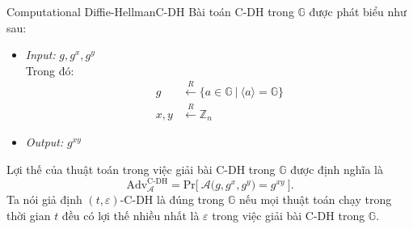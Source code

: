 \documentclass[class=report, crop=false]{standalone}
\begin{document}
			\begin{problem}{Computational Diffie-Hellman}{C-DH}
				Bài toán C-DH trong $\mathbb{G}$ được phát biểu như sau:
				\vspace{-\baselineskip}
				\begin{itemize}[leftmargin=1.5cm, itemindent=-0.5cm]
					\item[] \textit{Input:} $g, g^x, g^y$ \\
					Trong đó: \vspace{-\baselineskip}
					\begin{align*}
						g 		&\xleftarrow{R} \{ a \in \mathbb{G}\ | \ \langle a \rangle = \mathbb{G} \} \\
						x, y 	&\xleftarrow{R} \mathbb{Z}_n
					\end{align*}
					\item[] \textit{Output:} $g^{xy}$
				\end{itemize}
				\vspace{-\baselineskip}\par
				Lợi thế của thuật toán \algo trong việc giải bài C-DH trong $\mathbb{G}$ được định nghĩa là
				\[
					\text{Adv}_{\mathcal{A}}^{\text{C-DH}} = \text{Pr}\bigg[ \ \mathcal{A}\Big(g, g^x, g^y \Big) = g^{xy} \ \bigg].
				\] \indent
				Ta nói giả định $(t, \varepsilon)$-C-DH là đúng trong $\mathbb{G}$ nếu mọi thuật toán chạy trong thời gian $t$ đều có lợi thế nhiều nhất là $\varepsilon$ trong việc giải bài C-DH trong $\mathbb{G}$.
			\end{problem}
\end{document}
